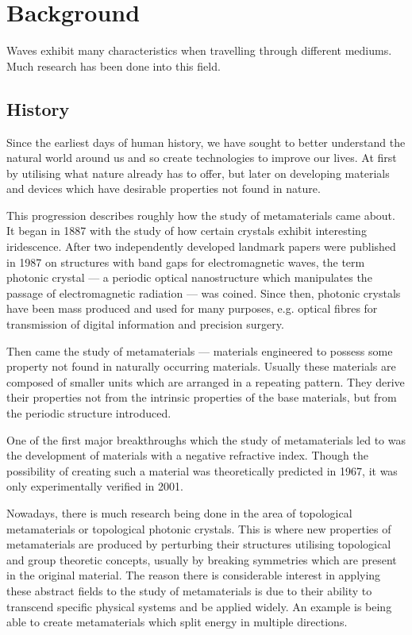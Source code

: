 \chapter{Background}
Waves exhibit many characteristics when travelling through different mediums.
Much research has been done into this field.

\section{History}
Since the earliest days of human history, we have sought to better understand
the natural world around us and so create technologies to improve our lives. At
first by utilising what nature already has to offer, but later on developing
materials and devices which have desirable properties not found in nature.

This progression describes roughly how the study of metamaterials came about.
It began in 1887 with the study of how certain crystals exhibit interesting
iridescence.\cite{pcearliest} After two independently developed landmark papers
were published in 1987 on structures with band gaps for electromagnetic
waves,\cite{pceli,pcjohn} the term photonic crystal --- a periodic optical
nanostructure which manipulates the passage of electromagnetic radiation ---
was coined.\cite{pcfocus} Since then, photonic crystals have been mass produced
and used for many purposes, e.g. optical fibres for transmission of digital
information \cite{pcopfib} and precision surgery.\cite{pcsurgery,pcneuro}

Then came the study of metamaterials --- materials engineered to possess some
property not found in naturally occurring materials.\cite{briefintro} Usually
these materials are composed of smaller units which are arranged in a repeating
pattern. They derive their properties not from the intrinsic properties of the
base materials, but from the periodic structure introduced.

One of the first major breakthroughs which the study of metamaterials led to
was the development of materials with a negative refractive index. Though the
possibility of creating such a material was theoretically predicted in
1967,\cite{negrefrac} it was only experimentally verified in
2001.\cite{negrefracex}

Nowadays, there is much research being done in the area of topological
metamaterials or topological photonic
crystals.\cite{topoedge,toposplit,topomet} This is where new properties of
metamaterials are produced by perturbing their structures utilising topological
and group theoretic concepts, usually by breaking symmetries which are present
in the original material. The reason there is considerable interest in applying
these abstract fields to the study of metamaterials is due to their ability to
transcend specific physical systems and be applied widely. An example is being
able to create metamaterials which split energy in multiple
directions.\cite{toposplit} 

